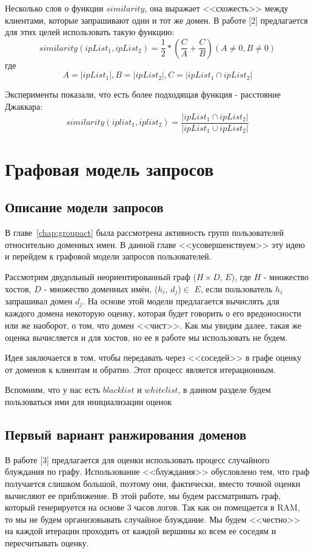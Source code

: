 \documentclass[a4paper,14pt]{extreport} %
\begin{document}
	
Несколько слов о функции $similarity$, она выражает <<схожесть>> между клиентами, которые запрашивают один и тот же домен. В работе [2] предлагается для этих целей использовать такую функцию: 
\begin{equation}
	\label{eq:ga-orig}
	similarity(ipList_1, ipList_2) = \frac{1}{2} * (\frac{C}{A} + \frac{C}{B}) (A\ne0, B\ne0)
\end{equation} 
где $$A = |ipList_1|, B = |ipList_2|, C = |ipList_1\cap ipList_2|$$
	
Эксперименты показали, что есть более подходящая функция - расстояние Джаккара: 
\begin{equation}
	\label{eq:ga-jacc}
	similarity(iplist_1, iplist_2) = \frac{|ipList_1\cap ipList_2|}{|ipList_1\cup ipList_2|}
\end{equation} 
	
\chapter{Графовая модель запросов}
\label{chap:graph}
\section{Описание модели запросов}
В главе~\ref{chap:groupact} была рассмотрена активность групп пользователей относительно доменных имен. В данной главе <<усовершенствуем>> эту идею и перейдем к графовой модели запросов пользователей.
	
Рассмотрим двудольный неориентированный граф ($H\times D$, $E$), где $H$ - множество хостов, $D$ - множество доменных имён, ($h_i$, $d_j$)$\in$ $E$, если пользователь $h_i$ запрашивал домен $d_j$. 
На основе этой модели предлагается вычислять для каждого домена некоторую оценку, которая будет говорить о его вредоносности или же наоборот, о том, что домен <<чист>>. Как мы увидим далее, такая же оценка вычисляется и для хостов, но ее в работе мы использовать не будем.

Идея заключается в том, чтобы передавать через <<соседей>> в графе оценку от доменов к клиентам и обратно. Этот процесс является итерационным.
	
			
Вспомним, что у нас есть $blacklist$ и $whitelist$, в данном разделе будем пользоваться ими для инициализации оценок

\section{Первый вариант ранжирования доменов}
В работе [3] предлагается для оценки использовать процесс случайного блуждания по графу. Использование <<блуждания>> обусловлено тем, что граф получается слишком большой, поэтому они, фактически, вместо точной оценки вычисляют ее приближение. В этой работе, мы будем рассматривать граф, который генерируется на основе 3 часов логов. Так как он помещается в RAM, то мы не будем организовывать случайное блуждание. Мы будем <<честно>> на каждой итерации проходить от каждой вершины ко всем ее соседям и пересчитывать оценку.
\end{document}
